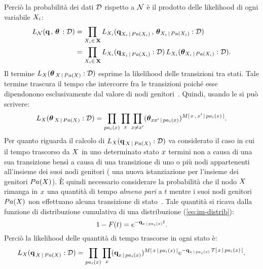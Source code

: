 Perciò la probabilità dei dati $\mathcal{D}$ rispetto a $\mathcal{N}$ è il prodotto delle likelihood di ogni variabile $\mathnormal{X_i}$:
\begin{align}\label{eq:ctbn-likelihood-decomp}
L_{\mathcal{N}}(\boldsymbol{\textbf{\text{q}}}\,,\,\boldsymbol{\textbf{\text{$\theta$}}}\,:\mathcal{D})&=\prod_{\mathnormal{X}_i\in\,\mathbf{X}}L_{\mathnormal{X}_i}(\boldsymbol{\textbf{\text{q}}}_{\mathnormal{X}_i\,\arrowvert\,Pa(\mathnormal{X}_i)}\,,\,\boldsymbol{\textbf{\text{$\theta$}}}_{\mathnormal{X}_i\,\arrowvert\,Pa(\mathnormal{X}_i)}:\mathcal{D}) \nonumber\\
&=\prod_{\mathnormal{X}_i\in\,\mathbf{X}} L_{\mathnormal{X}_i}(\boldsymbol{\textbf{\text{q}}}_{\mathnormal{X}_i\,\arrowvert\,Pa(\mathnormal{X}_i)}:\mathcal{D}) \, L_{\mathnormal{X}_i}(\boldsymbol{\textbf{\text{$\theta$}}}_{\mathnormal{X}_i\,\arrowvert\,Pa(\mathnormal{X}_i)}:\mathcal{D})\text{.}
\end{align}
Il termine $L_{\mathnormal{X}}(\boldsymbol{\textbf{\text{$\theta$}}}_{\,\mathnormal{X}\,\arrowvert\,Pa(\mathnormal{X})}:\mathcal{D})$ esprime la likelihood delle transizioni tra stati. Tale termine trascura il tempo che intercorre fra le transizioni poiché esse dipendonono esclusivamente dal valore di nodi genitori~\citep[si veda][3]{Nodelman2002}. Quindi, usando le \emph{\keyword{\stats{}}} si può scrivere:
\begin{equation}\label{eq:like-transitions}
L_{\setel{X}}(\param{$\theta$}_{\,\setel{X}\,\arrowvert\,Pa(\setel{X})}:\conceptsym{D})=\prod_{pa_i(\setel{x})} \prod_{x} \prod_{x\neq x^{\prime}}(\param{$\theta$}_{xx^{\prime}\,\arrowvert\,pa_i(\setel{x})})^{\mstat[x]{\setel{x}^{\prime}\,\arrowvert\,pa_i(\setel{x})}}\text{.}
\end{equation}
Per quanto riguarda il calcolo di $L_{\mathnormal{X}}(\boldsymbol{\textbf{\text{q}}}_{\,\mathnormal{X}\,\arrowvert\,Pa(\mathnormal{X})}:\mathcal{D})$ va considerato il caso in cui il tempo trascorso da $\mathnormal{X}$ in uno determinato stato $\mathnormal{x}$ termini non a causa di una sua transizione bensì a causa di una transizione di uno o più nodi appartenenti all'insieme dei suoi nodi genitori (\ie{} una nuova istanziazione per l'insieme dei genitori $Pa(\mathnormal{X})$). \`E quindi necessario considerare la probabilità che il nodo $\mathnormal{X}$ rimanga in $\mathnormal{x}$ una quantità di tempo \emph{almeno pari} a $t$ mentre i suoi nodi genitori $Pa(\mathnormal{X})$ non effettuano alcuna transizione di stato~\citep[si veda][3]{Nodelman2002}. Tale quantità si ricava dalla funzione di distribuzione cumulativa di una distribuzione  (\autoref{eq:im-distrib}):
\[
1-F(t)=e^{-\boldsymbol{\textbf{\text{q}}}_{\mathnormal{x}\,\arrowvert\,pa_i(\mathnormal{x})}t}\text{.}
\]
Perciò la likelihood delle quantità di tempo trascorse in ogni stato è:
\footnotesize
\begin{equation}\label{eq:like-time-spent-in-each-state}
L_{\setel{X}}(\param{q}_{\,\setel{X}\,\arrowvert\,Pa(\setel{X})}:\conceptsym{D})=\prod_{pa_i(\setel{x})}\prod_{x}(\param{q}_{x\,\arrowvert\,pa_i(\setel{x})})^{\mstat{x\,\arrowvert\,pa_i(\setel{x})}}e^{-\param{q}_{\setel{x}\,\arrowvert\,pa_i(\setel{x})}\,\tstat{\setel{x}\,\arrowvert\,pa_i(\setel{x})}}\text{\normalsize .}\vspace{1mm}
\end{equation}
